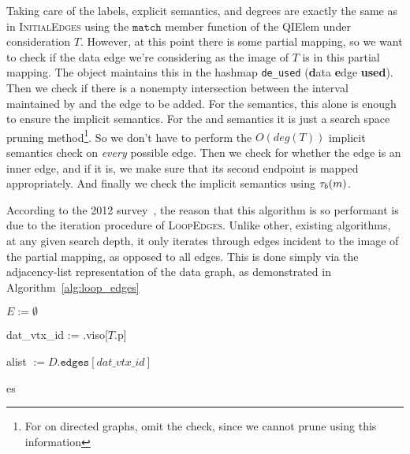 Taking care of the labels, explicit semantics, and degrees are exactly the same
as in \textsc{InitialEdges} using the $\texttt{match}$ member function of the
QIElem under consideration $T$. However, at this point there is some partial
mapping, so we want to check if the data edge we're considering as the image of
$T$ is in this partial mapping. The \iso object maintains this in the hashmap
\texttt{de\_used} (\textbf{d}ata \textbf{e}dge \textbf{used}). Then we check if
there is a nonempty intersection between the interval maintained by \iso and the
edge to be added. For the \concur semantics, this alone is enough to ensure the
implicit semantics. For the \strongConsec and \weakConsec semantics it is just a
search space pruning method\footnote{For \weakConsec on directed graphs, omit
  the check, since we cannot prune using this information}. So we don't have to
perform the $O(deg(T))$ implicit semantics check on \textit{every} possible
edge. Then we check \iso for whether the edge is an inner edge, and if it is, we
make sure that its second endpoint is mapped appropriately.  And finally we
check the implicit semantics using $\tau_b(m)$.

According to the 2012 survey~\cite{2012-VLDB-IsoSurvey}, the reason that this
algorithm is so performant is due to the iteration procedure of
\textsc{LoopEdges}. Unlike other, existing algorithms, at any given search
depth, it only iterates through edges incident to the image of the partial
mapping, as opposed to all edges.  This is done simply via the adjacency-list
representation of the data graph, as demonstrated in
Algorithm~\ref{alg:loop_edges}

\begin{algorithm}
  \label{alg:loop_edges}
  \caption{$\textsc{LoopEdges}(\seq, D, T, \iso)$}

  $E := \emptyset$\;
  
  dat\_vtx\_id := \iso.viso[$T$.p]\;
  
  alist $:= D.\texttt{edges}[dat\_vtx\_id]$\;

  \Return es \;
\end{algorithm}
